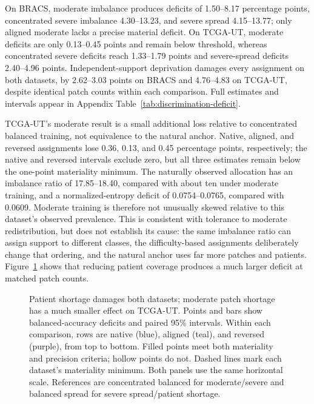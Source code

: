 \documentclass[11pt]{article}
\begin{document}
On BRACS, moderate imbalance produces deficits of \num{1.50}--\num{8.17} percentage points, concentrated severe imbalance \num{4.30}--\num{13.23}, and severe spread \num{4.15}--\num{13.77}; only aligned moderate lacks a precise material deficit. On TCGA-UT, moderate deficits are only \num{0.13}--\num{0.45} points and remain below threshold, whereas concentrated severe deficits reach \num{1.33}--\num{1.79} points and severe-spread deficits \num{2.40}--\num{4.96} points. Independent-support deprivation damages every assignment on both datasets, by \num{2.62}--\num{3.03} points on BRACS and \num{4.76}--\num{4.83} on TCGA-UT, despite identical patch counts within each comparison. Full estimates and intervals appear in Appendix Table~\ref{tab:discrimination-deficit}.

TCGA-UT's moderate result is a small additional loss relative to concentrated balanced training, not equivalence to the natural anchor. Native, aligned, and reversed assignments lose \num{0.36}, \num{0.13}, and \num{0.45} percentage points, respectively; the native and reversed intervals exclude zero, but all three estimates remain below the one-point materiality minimum. The naturally observed allocation has an imbalance ratio of \num{17.85}--\num{18.40}, compared with about ten under moderate training, and a normalized-entropy deficit of \num{0.0754}--\num{0.0765}, compared with \num{0.0609}. Moderate training is therefore not unusually skewed relative to this dataset's observed prevalence. This is consistent with tolerance to moderate redistribution, but does not establish its cause: the same imbalance ratio can assign support to different classes, the difficulty-based assignments deliberately change that ordering, and the natural anchor uses far more patches and patients. Figure~\ref{fig:damage-overview} shows that reducing patient coverage produces a much larger deficit at matched patch counts.

\begin{figure}[ht]
\centering

\caption{Patient shortage damages both datasets; moderate patch shortage has a much smaller effect on TCGA-UT. Points and bars show balanced-accuracy deficits and paired 95\% intervals. Within each comparison, rows are native (blue), aligned (teal), and reversed (purple), from top to bottom. Filled points meet both materiality and precision criteria; hollow points do not. Dashed lines mark each dataset's materiality minimum. Both panels use the same horizontal scale. References are concentrated balanced for moderate/severe and balanced spread for severe spread/patient shortage.}
\label{fig:damage-overview}
\end{figure}
\end{document}
